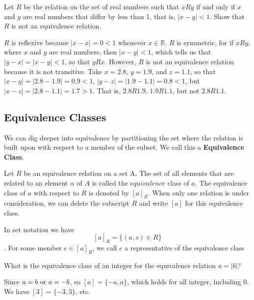 \begin{example}
	Let \( R \) be the relation on the set of real numbers such that \( xRy \) if and only if \( x \) and \( y \) are real numbers that differ by less than 1, that is, \( |x - y| < 1 \). Show that \( R \) is not an equivalence relation.
\end{example}
\begin{solution}
	\( R \) is reflexive because \( |x - x| = 0 < 1 \) whenever \( x \in \mathbb{R} \). \( R \) is symmetric, for if \( xRy \), where \( x \) and \( y \) are real numbers, then \( |x - y| < 1 \), which tells us that \( |y - x| = |x - y| < 1 \), so that \( yRx \). However, \( R \) is not an equivalence relation because it is not transitive. Take \( x = 2.8 \), \( y = 1.9 \), and \( z = 1.1 \), so that \( |x - y| = |2.8 - 1.9| = 0.9 < 1 \), \( |y - z| = |1.9 - 1.1| = 0.8 < 1 \), but \( |x - z| = |2.8 - 1.1| = 1.7 > 1 \). That is, \( 2.8R1.9 \), \( 1.9R1.1 \), but not \( 2.8R1.1 \).
\end{solution}

\subsection{Equivalence Classes}
We can dig deeper into equivalence by partitioning the set where the relation is built upon with respect to a member of the subset. We call this a \textbf{Equivalence Class}. 

\begin{definition}
	Let $R$ be an equivalence relation on a set A. The set of all elements that are related to an element $\alpha$ of $A$ is called the $equivalence$ class of $a$. The equivalence class of $a$ with respect to $R$ is denoted by $[a]_R$. When only one relation is under consideration, we can delete the subscript $R$ and write $[a]$ for this equivalence class.
\end{definition}
\begin{remark}
	In set notation we have $$[a]_R = \{ (a,s) \in R\}$$. For some member $e\in [a]_R$, we call $e$ a representative of the equivalence class
\end{remark}

\begin{example}
	What is the equivalence class of an integer for the equivalence relation $a = |b|$?
\end{example}
\begin{solution}
	Since $a = b \text{ or } a = -b$, so $[a] = \{-a,a\}$, which holds for all integer, including 0. We have $[3] = \{ -3, 3\}$, etc.
\end{solution}

